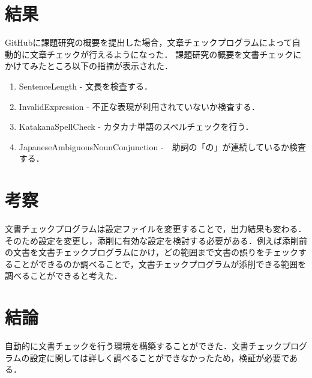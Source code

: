 \documentclass[uplatex,twocolumn,dvipdfmx]{jsarticle}
\begin{document}
\section{結果}
GitHubに課題研究の概要を提出した場合，文章チェックプログラムによって自動的に文章チェックが行えるようになった．
課題研究の概要を文書チェックにかけてみたところ以下の指摘が表示された．
\begin{enumerate}
\item SentenceLength - 文長を検査する．
\item InvalidExpression - 不正な表現が利用されていないか検査する．
\item KatakanaSpellCheck - カタカナ単語のスペルチェックを行う．
\item JapaneseAmbiguousNounConjunction -　助詞の「の」が連続しているか検査する．
\end{enumerate}

\section{考察}

文書チェックプログラムは設定ファイルを変更することで，出力結果も変わる．そのため設定を変更し，添削に有効な設定を検討する必要がある．例えば添削前の文書を文書チェックプログラムにかけ，どの範囲まで文書の誤りをチェックすることができるのか調べることで，文書チェックプログラムが添削できる範囲を調べることができると考えた．

\section{結論}
自動的に文書チェックを行う環境を構築することができた．文書チェックプログラムの設定に関しては詳しく調べることができなかったため，検証が必要である．



\end{document}
